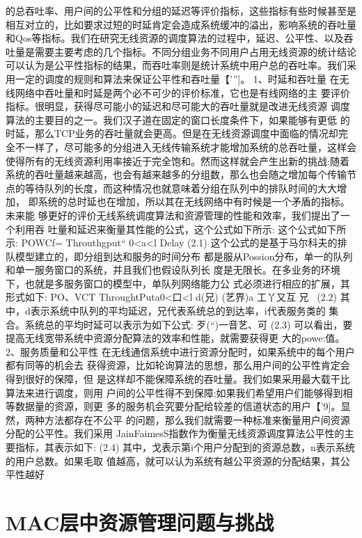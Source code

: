 的总吞吐率、用户间的公平性和分组的延迟等评价指标，这些指标有些时候甚至是
相互对立的，比如要求过短的时延肯定会造成系统缓冲的溢出，影响系统的吞吐量
和Qos等指标。我们在研究无线资源的调度算法的过程中，延迟、公平性、以及吞
吐量是需要主要考虑的几个指标。不同分组业务不同用户占用无线资源的统计结论
可以认为是公平性指标的结果，而吞吐率则是统计系统中用户总的吞吐率。我们采
用一定的调度的规则和算法来保证公平性和吞吐量【’”]。
1、时延和吞吐量
在无线网络中吞吐量和时延是两个必不可少的评价标准，它也是有线网络的主
要评价指标。很明显，获得尽可能小的延迟和尽可能大的吞吐量就是改进无线资源
调度算法的主要目的之一。我们汉子道在固定的窗口长度条件下，如果能够有更低
的时延，那么TCP业务的吞吐量就会更高。但是在无线资源调度中面临的情况却完
全不一样了，尽可能多的分组进入无线传输系统才能增加系统的总吞吐量，这样会
使得所有的无线资源利用率接近于完全饱和。然而这样就会产生出新的挑战:随着
系统的吞吐量越来越高，也会有越来越多的分组数，那么也会随之增加每个传输节
点的等待队列的长度，而这种情况也就意味着分组在队列中的排队时间的大大增加，
即系统的总时延也在增加，所以其在无线网络中有时候是一个矛盾的指标。未来能
够更好的评价无线系统调度算法和资源管理的性能和效率，我们提出了一个利用吞
吐量和延迟来衡量其性能的公式，这个公式如下所示:
这个公式如下所示:
POWCf=
Throuthgput“
0<a<l
Delay (2.1)
这个公式的是基于马尔科夫的排队模型建立的，即分组到达和服务的时间分布
都是服从Possion分布，单一的队列和单一服务窗口的系统，并且我们也假设队列长
度是无限长。在多业务的环境下，也就是多服务窗口的模型中，单队列网络能力公
式必须进行相应的扩展，其形式如下:
PO、VCT
ThroughtPuta0<口<l
d(兄)
(艺界)a
工丫又互
兄~
 (2.2)
其中，d表示系统中队列的平均延迟，兄代表系统总的到达率，i代表服务类的
集合。系统总的平均时延可以表示为如下公式:
歹(“)一音艺、可 (2.3)
可以看出，要提高无线宽带系统中资源分配算法的效率和性能，就需要获得更
大的powe:值。
2、服务质量和公平性
在无线通信系统中进行资源分配时，如果系统中的每个用户都有同等的机会去
获得资源，比如轮询算法的思想，那么用户间的公平性肯定会得到很好的保障，但
是这样却不能保障系统的吞吐量。我们如果采用最大载干比算法来进行调度，则用
户间的公平性得不到保障;如果我们希望用户们能够得到相等数据量的资源，则更
多的服务机会究要分配给较差的信道状态的用户【’9]。显然，两种方法都存在不公平
的问题，那么我们就需要一种标准来衡量用户间资源分配的公平性。我们采用
JainFaimesS指数作为衡量无线资源调度算法公平性的主要指标，其表示如下:
 (2.4)
其中，戈表示第i个用户分配到的资源总数，n表示系统的用户总数。如果毛取
值越高，就可以认为系统有越公平资源的分配结果，其公平性越好

\section{MAC层中资源管理问题与挑战}


